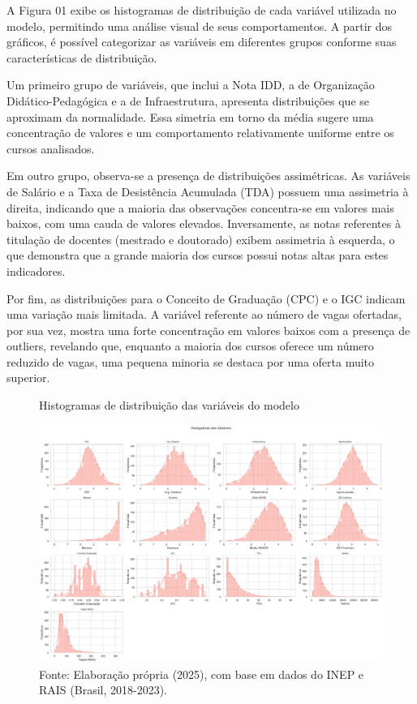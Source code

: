A Figura 01 exibe os histogramas de distribuição de cada variável utilizada no modelo, permitindo uma análise visual de seus comportamentos. A partir dos gráficos, é possível categorizar as variáveis em diferentes grupos conforme suas características de distribuição.

Um primeiro grupo de variáveis, que inclui a Nota IDD, a de Organização Didático-Pedagógica e a de Infraestrutura, apresenta distribuições que se aproximam da normalidade. Essa simetria em torno da média sugere uma concentração de valores e um comportamento relativamente uniforme entre os cursos analisados.
    
Em outro grupo, observa-se a presença de distribuições assimétricas. As variáveis de Salário e a Taxa de Desistência Acumulada (TDA) possuem uma assimetria à direita, indicando que a maioria das observações concentra-se em valores mais baixos, com uma cauda de valores elevados. Inversamente, as notas referentes à titulação de docentes (mestrado e doutorado) exibem assimetria à esquerda, o que demonstra que a grande maioria dos cursos possui notas altas para estes indicadores.
    
Por fim, as distribuições para o Conceito de Graduação (CPC) e o IGC indicam uma variação mais limitada. A variável referente ao número de vagas ofertadas, por sua vez, mostra uma forte concentração em valores baixos com a presença de outliers, revelando que, enquanto a maioria dos cursos oferece um número reduzido de vagas, uma pequena minoria se destaca por uma oferta muito superior.


\begin{figure}[H]
    \centering
    \caption{Histogramas de distribuição das variáveis do modelo}
    \label{fig:hist}
    \includegraphics[width=\textwidth]{fig1_histograms.png}
    \caption*{Fonte: Elaboração própria (2025), com base em dados do INEP e RAIS (Brasil, 2018-2023).}
\end{figure}


